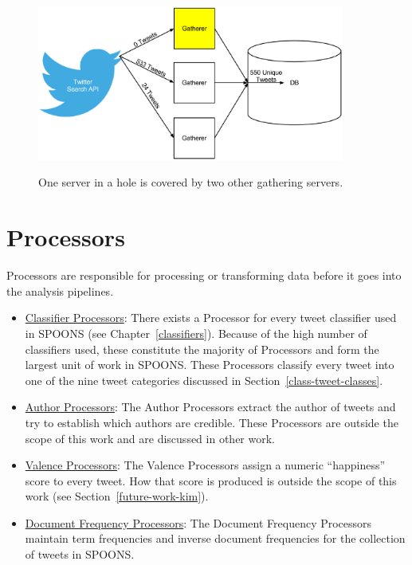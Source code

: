 \documentclass[12pt]{ucthesis}
\newcommand{\captionfonts}{\small\bf\ssp}
\begin{document}
\begin{figure}
   \begin{center}
      \includegraphics[width=0.9\textwidth]{images/Twitter_Holes.eps}
      \captionfonts
      \caption[Twitter Holes]{One server in a hole is covered by two other gathering servers.}
      \label{fig:twitterHoles}
   \end{center}
\end{figure}

\section{Processors}
\label{arch-processors}
Processors are responsible for processing or transforming data before it goes into the analysis pipelines.
\begin{itemize}
   \item \underline{Classifier Processors}: There exists a Processor for every tweet classifier used in SPOONS (see Chapter~\ref{classifiers}).
   Because of the high number of classifiers used, these constitute the majority of Processors and form the largest unit of work in SPOONS.
   These Processors classify every tweet into one of the nine tweet categories discussed in Section~\ref{class-tweet-classes}.

   \item \underline{Author Processors}: The Author Processors extract the author of tweets and try to establish which authors are credible. These Processors are
   outside the scope of this work and are discussed in other work\cite{cailinThesis}.

   \item \underline{Valence Processors}: The Valence Processors assign a numeric ``happiness'' score to every tweet. How that score is produced is outside the
   scope of this work (see Section~\ref{future-work-kim}).

   \item \underline{Document Frequency Processors}: The Document Frequency Processors maintain term frequencies and inverse document frequencies for the collection
   of tweets in SPOONS.
\end{itemize}
\end{document}
